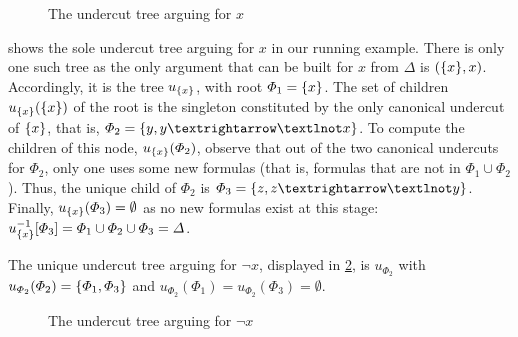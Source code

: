 \documentclass[version=3.21, pagesize, twoside=off, bibliography=totoc, DIV=calc, fontsize=12pt, a4paper, french, english]{scrartcl}
\begin{document}
\begin{figure}
	\caption{The undercut tree arguing for $x$}
	\label{fig:utx}
\end{figure}
\begin{example}
	\label{ex:abstUnder}
	 shows the sole undercut tree arguing for $x$ in our running example. There is only one such tree as the only argument that can be built for $x$ from $\Delta$ is $(\{x\}, x)$. Accordingly, it is the tree $u_{\{x\}}$, with root $\Phi_1 = \{x\}$. The set of children $u_{\{x\}}(\{x\})$ of the root is the singleton constituted by the only canonical undercut of $\{x\}$, that is, $\Phi_2 = \set{y, y → ¬x}$. 
	To compute the children of this node, $u_{\{x\}}(\Phi_2)$, observe that out of the two canonical undercuts for $\Phi_2$, only one uses some new formulas (that is, formulas that are not in $\Phi_1 \cup \Phi_2$). Thus, the unique child of $\Phi_2$ is $\Phi_3 = \set{z, z → ¬y}$. 
	Finally, $u_{\{x\}}(\Phi_3) = \emptyset$ as no new formulas exist at this stage: $u_{\{x\}}^{-1}[\Phi_3] = \Phi_1 \cup \Phi_2 \cup \Phi_3 = \Delta$.
	
	The unique undercut tree arguing for $¬x$, displayed in \cref{fig:utnx}, is $u_{\Phi_2}$ with $u_{\Phi_2}(\Phi_2) = \{\Phi_1, \Phi_3\}$ and $u_{\Phi_2}(\Phi_1) = u_{\Phi_2}(\Phi_3) = \emptyset$.
\end{example}
\begin{figure}
	\caption{The undercut tree arguing for $¬x$}
	\label{fig:utnx}
\end{figure}
\end{document}
